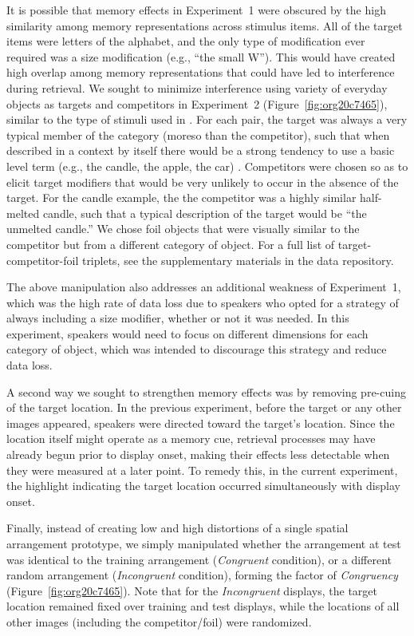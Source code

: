 \documentclass[natbib,doc,a4paper]{apa6}
\begin{document}
It is possible that memory effects in Experiment~1 were obscured by the high similarity among memory representations across stimulus items. All of the target items were letters of the alphabet, and the only type of modification ever required was a size modification (e.g., ``the small W''). This would have created high overlap among memory representations that could have led to interference during retrieval. We sought to minimize interference using variety of everyday objects as targets and competitors in Experiment~2 (Figure~\ref{fig:org20c7465}), similar to the type of stimuli used in \cite{GannBarr2014}. For each pair, the target was always a very typical member of the category (moreso than the competitor), such that when described in a context by itself there would be a strong tendency to use a basic level term (e.g., the candle, the apple, the car) \citep{roschetal76}. Competitors were chosen so as to elicit target modifiers that would be very unlikely to occur in the absence of the target. For the candle example, the the competitor was a highly similar half-melted candle, such that a typical description of the target would be ``the unmelted candle.''  We chose foil objects that were visually similar to the competitor but from a different category of object. For a full list of target-competitor-foil triplets, see the supplementary materials in the data repository.

The above manipulation also addresses an additional weakness of Experiment~1, which was the high rate of data loss due to speakers who opted for a strategy of always including a size modifier, whether or not it was needed. In this experiment, speakers would need to focus on different dimensions for each category of object, which was intended to discourage this strategy and reduce data loss.

A second way we sought to strengthen memory effects was by removing pre-cuing of the target location. In the previous experiment, before the target or any other images appeared, speakers were directed toward the target's location. Since the location itself might operate as a memory cue, retrieval processes may have already begun prior to display onset, making their effects less detectable when they were measured at a later point.  To remedy this, in the current experiment, the highlight indicating the target location occurred simultaneously with display onset.

Finally, instead of creating low and high distortions of a single spatial arrangement prototype, we simply manipulated whether the arrangement at test was identical to the training arrangement (\emph{Congruent} condition), or a different random arrangement (\emph{Incongruent} condition), forming the factor of \emph{Congruency} (Figure~\ref{fig:org20c7465}). Note that for the \emph{Incongruent} displays, the target location remained fixed over training and test displays, while the locations of all other images (including the competitor/foil) were randomized.
\end{document}
